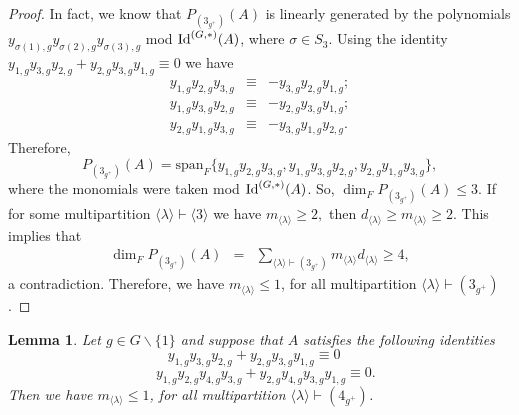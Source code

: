 \documentclass{amsart}
\newcommand{\IdG}{\ensuremath{\textnormal{Id}^{(G,\ast)}}}
\newtheorem{lema}[teorema]{Lemma}
\numberwithin{equation}{section}
\begin{document}
 \begin{proof}
   In fact, we know that $P_{(3_{g^+})}(A)$ is linearly generated by the polynomials $y_{\sigma(1),g}y_{\sigma(2),g}y_{\sigma(3),g}$ mod $\IdG(A)$, where $\sigma \in S_3$. Using the identity $y_{1,g}y_{3,g}y_{2,g}+y_{2,g}y_{3,g}y_{1,g}\equiv 0$ we have
$$\begin{array}{ccc}
y_{1,g}y_{2,g}y_{3,g}& \equiv &-y_{3,g}y_{2,g}y_{1,g}; \\
y_{1,g}y_{3,g}y_{2,g}&\equiv &-y_{2,g}y_{3,g}y_{1,g}; \\
y_{2,g}y_{1,g}y_{3,g}&\equiv &-y_{3,g}y_{1,g}y_{2,g}.
\end{array}$$
Therefore,
$$P_{(3_{g^+})}(A)=\mbox{span}_F\{y_{1,g}y_{2,g}y_{3,g}, y_{1,g}y_{3,g}y_{2,g}, y_{2,g}y_{1,g}y_{3,g}\}, $$
	where the monomials were taken mod $\IdG(A)$. So, $\dim_F P_{(3_{g^+})}(A)\leq 3. $ If for some multipartition $\langle \lambda \rangle \vdash \langle 3 \rangle$ we have $m_{\langle \lambda \rangle}\ge 2,$ then $d_{\langle \lambda \rangle}\ge m_{\langle \lambda \rangle}\ge 2$. This implies that
	$$\begin{array}{ccl}\dim_FP_{(3_{g^+})}(A)& =& \sum\limits_{\langle \lambda \rangle \vdash ( 3_{g^+} )}m_{\langle \lambda \rangle}d_{\langle \lambda \rangle} \ge 4,\end{array}$$ a contradiction. 
	Therefore, we have $m_{\langle \lambda \rangle}\le 1$, for all multipartition $\langle \lambda \rangle \vdash (3_{g^+})$. 
\end{proof}

\begin{lema}\label{ref0.1} Let $g\in G\backslash \{1\}$ and suppose that $A$ satisfies the following identities 
\begin{equation}\label{eq-1}
    y_{1,g}y_{3,g}y_{2,g}+y_{2,g}y_{3,g}y_{1,g}\equiv 0\;\;\;
\end{equation}
\begin{equation}\label{eq-2}
\;\;\;y_{1,g}y_{2,g}y_{4,g}y_{3,g}+ y_{2,g}y_{4,g}y_{3,g} y_{1,g} \equiv 0
.\end{equation} 
Then we have $m_{\langle \lambda \rangle}\le 1$, for all multipartition $\langle \lambda \rangle \vdash (4_{g^+})$.

     
		\end{lema}
\end{document}

